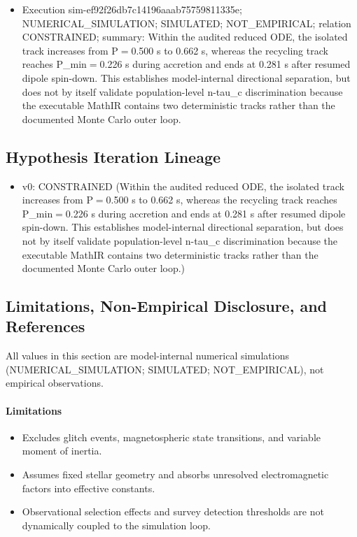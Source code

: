 \documentclass[11pt]{article}
\begin{document}
\begin{itemize}
\item Execution sim-ef92f26db7c14196aaab75759811335e; NUMERICAL\_SIMULATION; SIMULATED; NOT\_EMPIRICAL; relation CONSTRAINED; summary: Within the audited reduced ODE, the isolated track increases from P\ensuremath{=}0.500 s to 0.662 s, whereas the recycling track reaches P\_min\ensuremath{=}0.226 s during accretion and ends at 0.281 s after resumed dipole spin-down. This establishes model-internal directional separation, but does not by itself validate population-level n-tau\_c discrimination because the executable MathIR contains two deterministic tracks rather than the documented Monte Carlo outer loop.
\end{itemize}

\subsection{Hypothesis Iteration Lineage}

\begin{itemize}\raggedright
\item v0: CONSTRAINED (Within the audited reduced ODE, the isolated track increases from P\ensuremath{=}0.500 s to 0.662 s, whereas the recycling track reaches P\_\allowbreak{}min\ensuremath{=}0.226 s during accretion and ends at 0.281 s after resumed dipole spin-down. This establishes model-internal directional separation, but does not by itself validate population-level n-tau\_\allowbreak{}c discrimination because the executable MathIR contains two deterministic tracks rather than the documented Monte Carlo outer loop.)
\end{itemize}

\subsection{Limitations, Non-Empirical Disclosure, and References}

\noindent All values in this section are model-internal numerical simulations (NUMERICAL\_SIMULATION; SIMULATED; NOT\_EMPIRICAL), not empirical observations.

\paragraph{Limitations}
\begin{itemize}\raggedright
\item Excludes glitch events, magnetospheric state transitions, and variable moment of inertia.
\item Assumes fixed stellar geometry and absorbs unresolved electromagnetic factors into effective constants.
\item Observational selection effects and survey detection thresholds are not dynamically coupled to the simulation loop.
\end{itemize}
\end{document}
